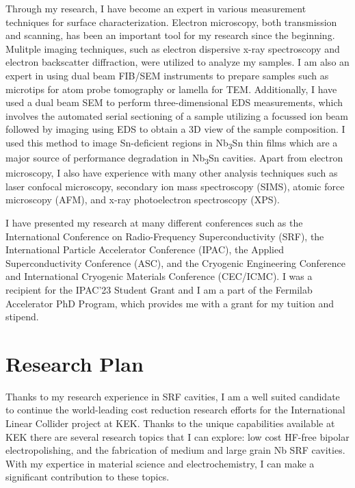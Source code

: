 \documentclass[]{revtex4-2}
\begin{document}
    Through my research, I have become an expert in various measurement techniques for surface characterization. Electron microscopy, both transmission and scanning, has been an important tool for my research since the beginning. Mulitple imaging techniques, such as electron dispersive x-ray spectroscopy and electron backscatter diffraction, were utilized to analyze my samples. I am also an expert in using dual beam FIB/SEM instruments to prepare samples such as microtips for atom probe tomography or lamella for TEM. Additionally, I have used a dual beam SEM to perform three-dimensional EDS measurements, which involves the automated serial sectioning of a sample utilizing a focussed ion beam followed by imaging using EDS to obtain a 3D view of the sample composition. I used this method to image Sn-deficient regions in Nb\textsubscript{3}Sn thin films which are a major source of performance degradation in Nb\textsubscript{3}Sn cavities. \cite{viklund2023three} Apart from electron microscopy, I also have experience with many other analysis techniques such as laser confocal microscopy, secondary ion mass spectroscopy (SIMS), atomic force microscopy (AFM), and x-ray photoelectron spectroscopy (XPS).

    I have presented my research at many different conferences such as the International Conference on Radio-Frequency Superconductivity (SRF), the International Particle Accelerator Conference (IPAC), the Applied Superconductivity Conference (ASC), and the Cryogenic Engineering Conference and International Cryogenic Materials Conference (CEC/ICMC). I was a recipient for the IPAC'23 Student Grant and I am a part of the Fermilab Accelerator PhD Program, which provides me with a grant for my tuition and stipend.





\section{Research Plan}


    Thanks to my research experience in SRF cavities, I am a well suited candidate to continue the world-leading cost reduction research efforts for the International Linear Collider project at KEK. Thanks to the unique capabilities available at KEK there are several research topics that I can explore: low cost HF-free bipolar electropolishing, and the fabrication of medium and large grain Nb SRF cavities. With my expertice in material science and electrochemistry, I can make a significant contribution to these topics.
    
\end{document}
